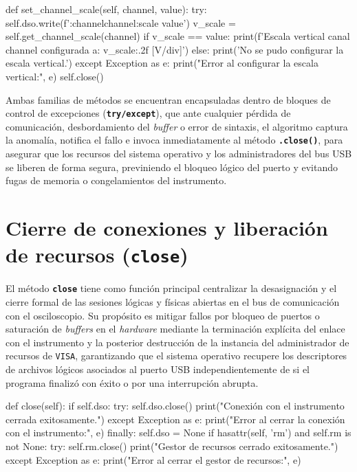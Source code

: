 \begin{python}
def set_channel_scale(self, channel, value):
    try:
        self.dso.write(f':channel{channel}:scale {value}')
        v_scale = self.get_channel_scale(channel)
        if v_scale == value:
            print(f'Escala vertical canal {channel} configurada a: {v_scale:.2f} [V/div]')
        else:
            print('No se pudo configurar la escala vertical.')
    except Exception as e:
        print("Error al configurar la escala vertical:", e)
        self.close()
\end{python}

Ambas familias de métodos se encuentran encapsuladas dentro de bloques de control de excepciones (\textbf{\texttt{try/except}}), que ante cualquier pérdida de comunicación, desbordamiento del \textit{buffer} o error de sintaxis, el algoritmo captura la anomalía, notifica el fallo e invoca inmediatamente al método \textbf{\texttt{.close()}}, para asegurar que los recursos del sistema operativo y los administradores del bus USB se liberen de forma segura, previniendo el bloqueo lógico del puerto y evitando fugas de memoria o congelamientos del instrumento.

\section{Cierre de conexiones y liberación de recursos (\texttt{close})}
El método \textbf{\texttt{close}} tiene como función principal centralizar la desasignación y el cierre formal de las sesiones lógicas y físicas abiertas en el bus de comunicación con el osciloscopio. Su propósito es mitigar fallos por bloqueo de puertos o saturación de \textit{buffers} en el \textit{hardware} mediante la terminación explícita del enlace con el instrumento y la posterior destrucción de la instancia del administrador de recursos de \texttt{VISA}, garantizando que el sistema operativo recupere los descriptores de archivos lógicos asociados al puerto USB independientemente de si el programa finalizó con éxito o por una interrupción abrupta.\par

\begin{python}
def close(self):
    if self.dso:
        try:
            self.dso.close()
            print("Conexión con el instrumento cerrada exitosamente.")
        except Exception as e:
            print("Error al cerrar la conexión con el instrumento:", e)
        finally:
            self.dso = None
    if hasattr(self, 'rm') and self.rm is not None:
        try:
            self.rm.close()
            print("Gestor de recursos cerrado exitosamente.")
        except Exception as e:
            print("Error al cerrar el gestor de recursos:", e)
\end{python}

